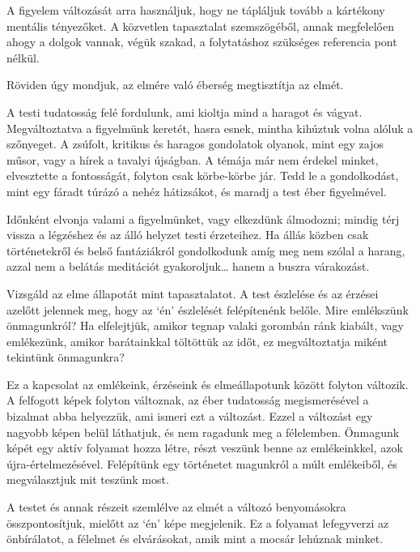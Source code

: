 A figyelem változását arra használjuk, hogy ne tápláljuk tovább a
kártékony mentális tényezőket. A közvetlen tapasztalat szemszögéből,
annak megfelelően ahogy a dolgok vannak, végük szakad, a folytatáshoz
szükséges referencia pont nélkül.

Röviden úgy mondjuk, az elmére való éberség megtisztítja az elmét.

A testi tudatosság felé fordulunk, ami kioltja mind a haragot és vágyat.
Megváltoztatva a figyelmünk keretét, hasra esnek, mintha kihúztuk volna
alóluk a szőnyeget. A zsúfolt, kritikus és haragos gondolatok olyanok,
mint egy zajos műsor, vagy a hírek a tavalyi újságban. A témája már nem
érdekel minket, elvesztette a fontosságát, folyton csak körbe-körbe jár.
Tedd le a gondolkodást, mint egy fáradt túrázó a nehéz hátizsákot, és
maradj a test éber figyelmével.

Időnként elvonja valami a figyelmünket, vagy elkezdünk álmodozni; mindig
térj vissza a légzéshez és az álló helyzet testi érzeteihez. Ha állás
közben csak történetekről és belső fantáziákról gondolkodunk amíg meg
nem szólal a harang, azzal nem a belátás meditációt gyakoroljuk\ldots{}
hanem a buszra várakozást.


Vizsgáld az elme állapotát mint tapasztalatot. A test észlelése és az
érzései azelőtt jelennek meg, hogy az `én' észlelését felépítenénk
belőle. Mire emlékszünk önmagunkról? Ha elfelejtjük, amikor tegnap
valaki gorombán ránk kiabált, vagy emlékezünk, amikor barátainkkal
töltöttük az időt, ez megváltoztatja miként tekintünk önmagunkra?

Ez a kapcsolat az emlékeink, érzéseink és elmeállapotunk között folyton
változik. A felfogott képek folyton változnak, az éber tudatosság
megismerésével a bizalmat abba helyezzük, ami ismeri ezt a változást.
Ezzel a változást egy nagyobb képen belül láthatjuk, és nem ragadunk meg
a félelemben. Önmagunk képét egy aktív folyamat hozza létre, részt
veszünk benne az emlékeinkkel, azok újra-értelmezésével. Felépítünk egy
történetet magunkról a múlt emlékeiből, és megválasztjuk mit teszünk
most.


A testet és annak részeit szemlélve az elmét a változó benyomásokra
összpontosítjuk, mielőtt az `én' képe megjelenik. Ez a folyamat
lefegyverzi az önbírálatot, a félelmet és elvárásokat, amik mint a
mocsár lehúznak minket.

